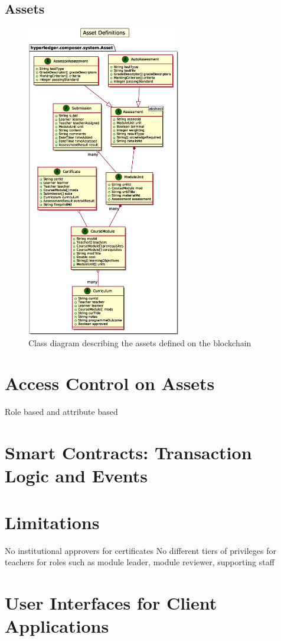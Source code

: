 \subsection{Assets}
\begin{figure}[!ht] 
    \centering    
    \includegraphics[width=0.6\textwidth]{assets}
    \caption[Assets Class Diagram]
        {Class diagram describing the assets defined on the blockchain} 
    \label{fig:assets}
\end{figure}

\section{Access Control on Assets}
Role based and attribute based

\section{Smart Contracts: Transaction Logic and Events}

\section{Limitations}
No institutional approvers for certificates
No different tiers of privileges for teachers for roles such as module leader, module reviewer, supporting staff

\section{User Interfaces for Client Applications}
